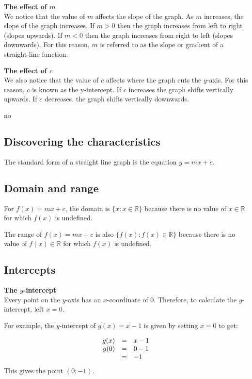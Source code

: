 \textbf{The effect of $m$}\\
We notice that the value of $m$ affects the slope of the graph. As $m$ increases, the slope of the graph increases. If $m>0$ then the graph increases from left to right (slopes upwards). If $m<0$ then the graph increases from right to left (slopes downwards). For this reason, $m$ is referred to as the slope or gradient of a straight-line function.\par 

\textbf{The effect of $c$}\\
We also notice that the value of $c$ affects where the graph cuts the $y$-axis. For this reason, $c$ is known as the y-intercept. If $c$ increases the graph shifts vertically upwards. If $c$ decreases, the graph shifts vertically downwards.\par no


\subsection*{Discovering the characteristics} 
The standard form of a straight line graph is the equation $y=mx + c$. 
\subsection*{Domain and range}
\nopagebreak
For $f(x)=mx+c$, the domain is $\{x:x\in \mathbb{R}\}$ because there is no value of $x\in \mathbb{R}$ for which $f(x)$ is undefined.\par 
The range of $f(x)=mx+c$ is also $\{f(x):f(x)\in \mathbb{R}\}$ because there is no value of $f(x)\in \mathbb{R}$ for which $f(x)$ is undefined.\par 
\par 

\subsection*{Intercepts}
\textbf{The $y$-intercept}\\
Every point on the $y$-axis has an $x$-coordinate of $0$. Therefore, to calculate the $y$-intercept, left $x=0$.\par
For example, the $y$-intercept of $g(x)=x-1$ is given by setting $x=0$ to get:\par 

\begin{equation*}
\begin{array}{ccl}\hfill g(x)& =& x-1\hfill \\
\hfill g(0) &=& 0-1\hfill \\
& =& -1\hfill 
\end{array}
\end{equation*}
This gives the point $(0;-1)$.\par

